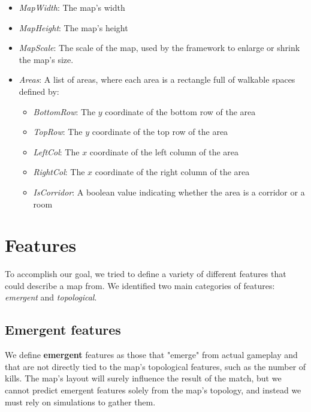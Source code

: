 \begin{itemize}
    \item \textit{MapWidth}: The map's width
    \item \textit{MapHeight}: The map's height
    \item \textit{MapScale}: The scale of the map, used by the framework to enlarge or shrink the map's size.
    \item \textit{Areas}: A list of areas, where each area is a rectangle full of walkable spaces defined by:
    \begin{itemize}
        \item \textit{BottomRow}: The $y$ coordinate of the bottom row of the area
        \item \textit{TopRow}: The $y$ coordinate of the top row of the area
        \item \textit{LeftCol}: The $x$ coordinate of the left column of the area
        \item \textit{RightCol}: The $x$ coordinate of the right column of the area
        \item \textit{IsCorridor}: A boolean value indicating whether the area is a corridor or a room
    \end{itemize}
\end{itemize}

\clearpage
\section{Features}
\label{sec:features}
To accomplish our goal, we tried to define a variety of different features that could describe a map from. We identified two main categories of features:  \textit{emergent} and \textit{topological}.

\subsection{Emergent features}
\label{subsec:emergent_features}
We define \textbf{emergent} features as those that "emerge" from actual gameplay and that are not directly tied to the map's topological features, such as the number of kills. The map's layout will surely influence the result of the match, but we cannot predict emergent features solely from the map's topology, and instead we must rely on simulations to gather them.

